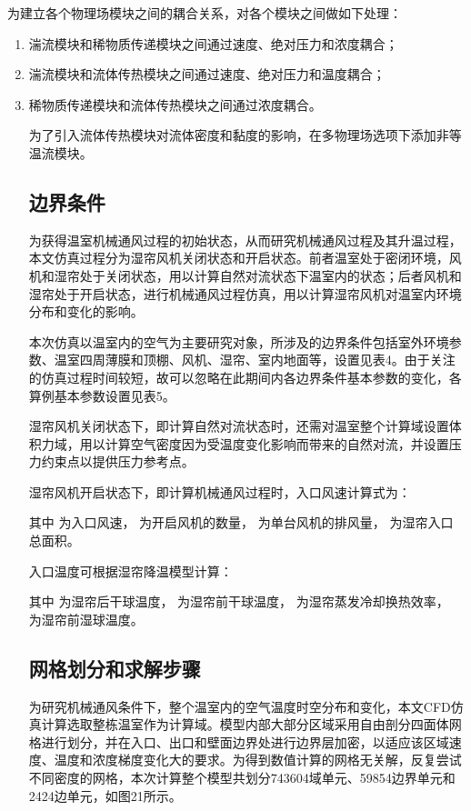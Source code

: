 为建立各个物理场模块之间的耦合关系，对各个模块之间做如下处理：
	\begin{enumerate}
		\item 湍流模块和稀物质传递模块之间通过速度、绝对压力和浓度耦合；
		\item 湍流模块和流体传热模块之间通过速度、绝对压力和温度耦合；
		\item 稀物质传递模块和流体传热模块之间通过浓度耦合。
	\begin{enumerate}
为了引入流体传热模块对流体密度和黏度的影响，在多物理场选项下添加非等温流模块。

	\subsection{边界条件}
	为获得温室机械通风过程的初始状态，从而研究机械通风过程及其升温过程，本文仿真过程分为湿帘风机关闭状态和开启状态。前者温室处于密闭环境，风机和湿帘处于关闭状态，用以计算自然对流状态下温室内的状态；后者风机和湿帘处于开启状态，进行机械通风过程仿真，用以计算湿帘风机对温室内环境分布和变化的影响。
	
本次仿真以温室内的空气为主要研究对象，所涉及的边界条件包括室外环境参数、温室四周薄膜和顶棚、风机、湿帘、室内地面等，设置见表4。由于关注的仿真过程时间较短，故可以忽略在此期间内各边界条件基本参数的变化，各算例基本参数设置见表5。

湿帘风机关闭状态下，即计算自然对流状态时，还需对温室整个计算域设置体积力域，用以计算空气密度因为受温度变化影响而带来的自然对流，并设置压力约束点以提供压力参考点。

湿帘风机开启状态下，即计算机械通风过程时，入口风速计算式为：

其中 为入口风速， 为开启风机的数量， 为单台风机的排风量， 为湿帘入口总面积。

入口温度可根据湿帘降温模型计算：

其中 为湿帘后干球温度， 为湿帘前干球温度， 为湿帘蒸发冷却换热效率， 为湿帘前湿球温度。

	\subsection{网格划分和求解步骤}
为研究机械通风条件下，整个温室内的空气温度时空分布和变化，本文CFD仿真计算选取整栋温室作为计算域。模型内部大部分区域采用自由剖分四面体网格进行划分，并在入口、出口和壁面边界处进行边界层加密，以适应该区域速度、温度和浓度梯度变化大的要求。为得到数值计算的网格无关解，反复尝试不同密度的网格，本次计算整个模型共划分743604域单元、59854边界单元和 2424边单元，如图21所示。


\end{enumerate}
\end{enumerate}
